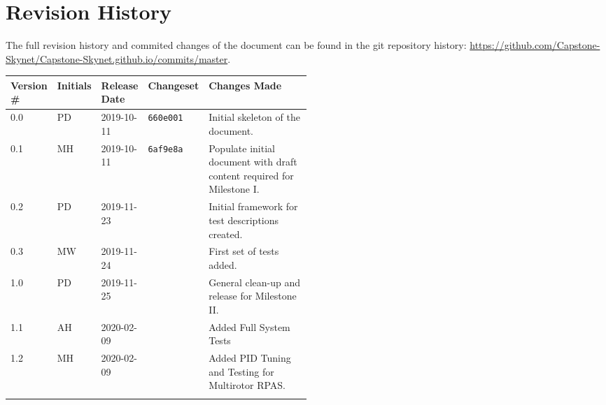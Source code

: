 \thispagestyle{empty}
\section*{Revision History}
The full revision history and commited changes of the document can be found in the git repository history: \href{https://github.com/Capstone-Skynet/Capstone-Skynet.github.io}{https://github.com/Capstone-Skynet/Capstone-Skynet.github.io/commits/master}.

\begin{table}[H]
\begin{tabular}{*{4}{l}p{0.5\linewidth}}
\hline
Version \# & Initials & Release Date & Changeset & Changes Made \\ \hline

0.0 & PD & 2019-10-11 & \texttt{660e001} & Initial skeleton of the document.\\
0.1 & MH & 2019-10-11 & \texttt{6af9e8a} & Populate initial document with draft content required for Milestone I.\\
0.2 & PD & 2019-11-23 & & Initial framework for test descriptions created.\\
0.3 & MW & 2019-11-24 & & First set of tests added.\\
1.0 & PD & 2019-11-25 & & General clean-up and release for Milestone II.\\
1.1 & AH & 2020-02-09 & & Added Full System Tests \\
1.2 & MH & 2020-02-09 & & Added PID Tuning and Testing for Multirotor RPAS. \\

 & & & \\ \hline
\end{tabular}
\end{table}